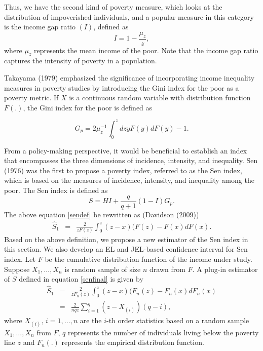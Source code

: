 \documentclass[11pt]{article}
\begin{document}
Thus, we have the second kind of poverty measure, which looks at the distribution of impoverished individuals, and a popular measure in this category is the income gap ratio $(I)$, defined as
\begin{equation*}
I=1-\frac{\mu_z}{z},
\end{equation*}
where $\mu_z$ represents the mean income of the poor. Note that the income gap ratio captures the intensity of poverty in a population.


Takayama (1979) emphasized the significance of incorporating income inequality measures in poverty studies  by introducing the Gini index for the poor as a poverty metric. If $X$ is a continuous random variable with distribution function $F(.)$, the Gini index for the poor is defined as

\begin{equation*}\label{gini}
G_p=2   \mu_z^{-1}\int_{0}^{z} dzyF(y)dF(y) - 1.
\end{equation*}

From a policy-making perspective, it would be beneficial to establish an index that encompasses the three dimensions of incidence, intensity, and inequality.  Sen (1976) was the first to propose a poverty index, referred to as the Sen index, which is based on the measures of incidence, intensity, and inequality among the poor. The Sen index is defined as
\begin{equation}\label{sendef}
S=HI+\frac{q}{q+1}(1-I)G_p.
\end{equation}
The above equation \eqref{sendef} be rewritten as (Davidson (2009))
\begin{eqnarray}\label{senfinal}
\widehat{S}_1&=&\frac{2}{zF(z)}\int_0^{z}(z-x)(F(z)-F(x)dF(x).
\end{eqnarray}
Based on the above definition, we propose a new estimator of the Sen index in this section. We also develop an EL and JEL-based confidence interval for Sen index.
Let $F$ be the cumulative distribution function of the income under study. Suppose  $X_1,\ldots,X_n$ is random sample of size $n$ drawn from $F$.
A plug-in estimator of $S$ defined in equation \eqref{senfinal} is given by
\begin{eqnarray}
\label{senest}
\widehat{S}_1&=&\frac{2}{zF_n(z)}\int_0^{z}(z-x)(F_n(z)-F_n(x)dF_n(x)\nonumber\\&=&\frac{2}{nqz}\sum_{i=1}^{q}(z-X_{(i)})\left(q-i\right),
\end{eqnarray}
where $X_{(i)},\, i=1,\ldots,n$ are the $i$-th order statistics based on a random sample $X_1,\ldots,X_n$ from $F$, $q$ represents the number of individuals living below the poverty line $z$  and $F_n(.)$ represents the empirical distribution function.
\end{document}
